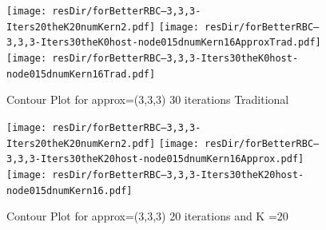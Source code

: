 \documentclass[12pt]{article}
\begin{document}








\begin{figure}
  \centering
\ifmacosx
  \texttt{[image: resDir/forBetterRBC--3,3,3-Iters20theK20numKern2.pdf]}
  \fi
\iflinux
  \texttt{[image: resDir/forBetterRBC--3,3,3-Iters30theK0host-node015dnumKern16ApproxTrad.pdf]}
  \texttt{[image: resDir/forBetterRBC--3,3,3-Iters30theK0host-node015dnumKern16Trad.pdf]}
\fi
  \caption{Contour Plot for approx=(3,3,3) 30 iterations Traditional}
  \label{fig:cntpltI}
\end{figure}

\begin{figure}
  \centering
\ifmacosx
  \texttt{[image: resDir/forBetterRBC--3,3,3-Iters20theK20numKern2.pdf]}
  \fi
\iflinux
  \texttt{[image: resDir/forBetterRBC--3,3,3-Iters30theK20host-node015dnumKern16Approx.pdf]}
  \texttt{[image: resDir/forBetterRBC--3,3,3-Iters30theK20host-node015dnumKern16.pdf]}
\fi
  \caption{Contour Plot for approx=(3,3,3) 20 iterations and K =20}
  \label{fig:cntpltI}
\end{figure}
\end{document}
